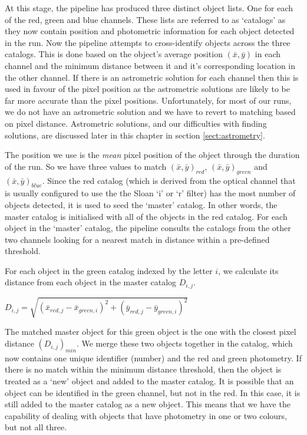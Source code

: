 At this stage, the pipeline has produced three distinct object lists. One for each of the red, green and blue channels. These lists are referred to as `catalogs' as they now contain position and photometric information for each object detected in the run.  Now the pipeline attempts to cross-identify objects across the three catalogs. This is done based on the object's average position $(\bar{x}, \bar{y})$ in each channel and the minimum distance between it and it's corresponding location in the other channel. If there is an astrometric solution for each channel then this is used in favour of the pixel position as the astrometric solutions are likely to be far more accurate than the pixel positions. Unfortunately, for most of our runs, we do not have an astrometric solution and we have to revert to matching based on pixel distance. Astrometric solutions, and our difficulties with finding solutions, are discussed later in this chapter in section \ref{sect:astrometry}.

The position we use is the \emph{mean} pixel position of the object through the duration of the run. So we have three values to match $(\bar{x}, \bar{y})_{red}$, $(\bar{x}, \bar{y})_{green}$ and $(\bar{x}, \bar{y})_{blue}$. Since the red catalog (which is derived from the optical channel that is usually configured to use the the Sloan `i' or `r' filter) has the most number of objects detected, it is used to seed the `master' catalog. In other words, the master catalog is initialised with all of the objects in the red catalog. For each object in the `master' catalog, the pipeline consults the catalogs from the other two channels looking for a nearest match in distance within a pre-defined threshold.

For each object in the green catalog indexed by the letter $i$, we calculate its distance from each object in the master catalog $D_{i,j}$. 

$D_{i,j} = \sqrt{(\bar{x}_{red, j}-\bar{x}_{green, i})^2 + (\bar{y}_{red, j}-\bar{y}_{green, i})^2}$ 

The matched master object for this green object is the one with the closest pixel distance $(D_{i,j})_{min}$. We merge these two objects together in the catalog, which now contains one unique identifier (number) and the red and green photometry. If there is no match within the minimum distance threshold, then the object is treated as a `new' object and added to the master catalog. It is possible that an object can be identified in the green channel, but not in the red. In this case, it is still added to the master catalog as a new object. This means that we have the capability of dealing with objects that have photometry in one or two colours, but not all three. 

